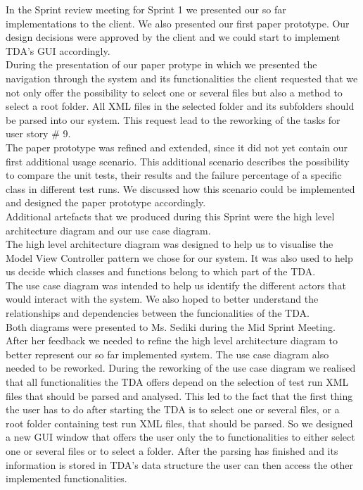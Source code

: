 In the Sprint review meeting for Sprint 1 we presented our so far implementations to the client. We also presented our first paper prototype. Our design decisions were approved by the client and we could start to implement TDA's GUI accordingly. \\ 

During the presentation of our paper protype in which we presented the navigation through the system and its functionalities the client requested that we not only offer the possibility to select one or several files but also a method to select a root folder. All XML files in the selected folder and its subfolders should be parsed into our system. This request lead to the reworking of the tasks for user story \# 9. \\ 

The paper prototype was refined and extended, since it did not yet contain our first additional usage scenario. This additional scenario describes the possibility to compare the unit tests, their results and the failure percentage of a specific class in different test runs. We discussed how this scenario could be implemented and designed the paper prototype accordingly. \\ 

Additional artefacts that we produced during this Sprint were the high level architecture diagram and our use case diagram. \\ 
The high level architecture diagram was designed to help us to visualise the Model View Controller pattern we chose for our system. It was also used to help us decide which classes and functions belong to which part of the TDA. \\ 
The use case diagram was intended to help us identify the different actors that would interact with the system. We also hoped to better understand the relationships and dependencies between the funcionalities of the TDA. \\ 

Both diagrams were presented to Ms. Sediki during the Mid Sprint Meeting. After her feedback we needed to refine the high level architecture diagram to better represent our so far implemented system. The use case diagram also needed to be reworked. During the reworking of the use case diagram we realised that all functionalities the TDA offers depend on the selection of test run XML files that should be parsed and analysed. This led to the fact that the first thing the user has to do after starting the TDA is to select one or several files, or a root folder containing test run XML files, that should be parsed. So we designed a new GUI window that offers the user only the to functionalities to either select one or several files or to select a folder. After the parsing has finished and its information is stored in TDA's data structure the user can then access the other implemented functionalities.

